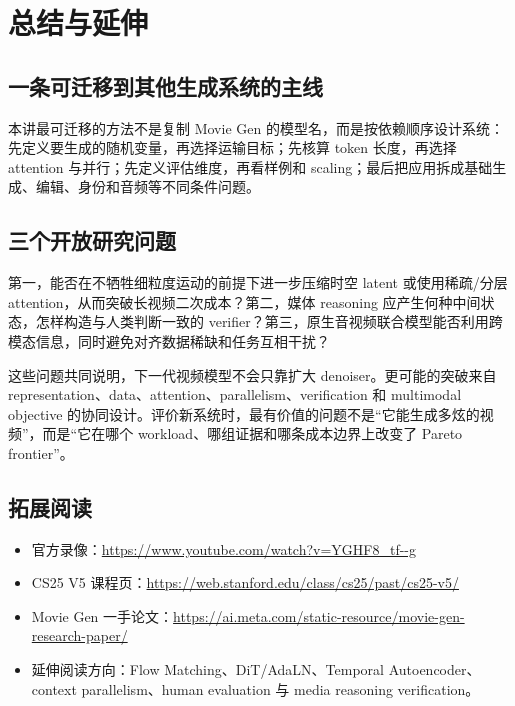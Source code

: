 \section{总结与延伸}

\subsection{一条可迁移到其他生成系统的主线}

本讲最可迁移的方法不是复制 Movie Gen 的模型名，而是按依赖顺序设计系统：先定义要生成的随机变量，再选择运输目标；先核算 token 长度，再选择 attention 与并行；先定义评估维度，再看样例和 scaling；最后把应用拆成基础生成、编辑、身份和音频等不同条件问题。

\subsection{三个开放研究问题}

第一，能否在不牺牲细粒度运动的前提下进一步压缩时空 latent 或使用稀疏/分层 attention，从而突破长视频二次成本？第二，媒体 reasoning 应产生何种中间状态，怎样构造与人类判断一致的 verifier？第三，原生音视频联合模型能否利用跨模态信息，同时避免对齐数据稀缺和任务互相干扰？

这些问题共同说明，下一代视频模型不会只靠扩大 denoiser。更可能的突破来自 representation、data、attention、parallelism、verification 和 multimodal objective 的协同设计。评价新系统时，最有价值的问题不是“它能生成多炫的视频”，而是“它在哪个 workload、哪组证据和哪条成本边界上改变了 Pareto frontier”。

\subsection{拓展阅读}

\begin{itemize}[itemsep=0.2em,topsep=0.2em]
  \item 官方录像：\url{https://www.youtube.com/watch?v=YGHF8_tf--g}
  \item CS25 V5 课程页：\url{https://web.stanford.edu/class/cs25/past/cs25-v5/}
  \item Movie Gen 一手论文：\url{https://ai.meta.com/static-resource/movie-gen-research-paper/}
  \item 延伸阅读方向：Flow Matching、DiT/AdaLN、Temporal Autoencoder、context parallelism、human evaluation 与 media reasoning verification。
\end{itemize}


